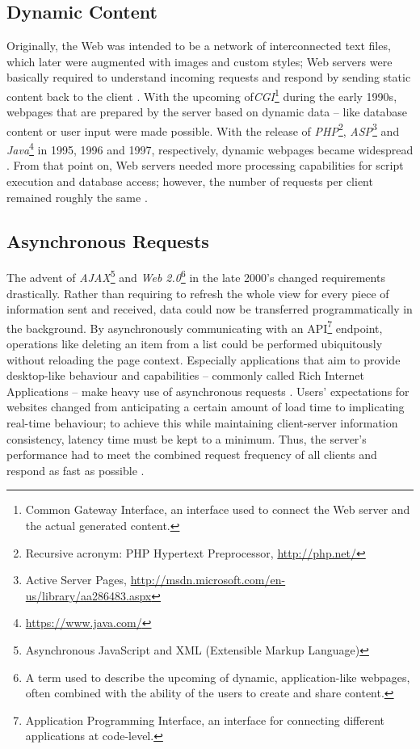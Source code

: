 \subsection{Dynamic Content}
Originally, the Web was intended to be a network of interconnected text files, which later were augmented with images and custom styles; Web servers were basically required to understand incoming requests and respond by sending static content back to the client \cite{http}. With the upcoming of\textit{CGI}\footnote{Common Gateway Interface, an interface used to connect the Web server and the actual generated content.} during the early 1990s, webpages that are prepared by the server based on dynamic data -- like database content or user input were made possible. With the release of \textit{PHP}\footnote{Recursive acronym: PHP Hypertext Preprocessor, \url{http://php.net/}}, \textit{ASP}\footnote{Active Server Pages, \url{http://msdn.microsoft.com/en-us/library/aa286483.aspx}} and \textit{Java}\footnote{\url{https://www.java.com/}} in 1995, 1996 and 1997, respectively, dynamic webpages became widespread \cite{webhistory}. From that point on, Web servers needed more processing capabilities for script execution and database access; however, the number of requests per client remained roughly the same \cite{webhistory}.

\subsection{Asynchronous Requests}
The advent of \textit{AJAX}\footnote{Asynchronous JavaScript and XML (Extensible Markup Language)} and \textit{Web 2.0}\footnote{A term used to describe the upcoming of dynamic, application-like webpages, often combined with the ability of the users to create and share content.} in the late 2000's changed requirements drastically. Rather than requiring to refresh the whole view for every piece of information sent and received, data could now be transferred programmatically in the background. By asynchronously communicating with an API\footnote{Application Programming Interface, an interface for connecting different applications at code-level.} endpoint, operations like deleting an item from a list could be performed ubiquitously without reloading the page context. Especially applications that aim to provide desktop-like behaviour and capabilities -- commonly called Rich Internet Applications -- make heavy use of asynchronous requests \cite[p. 4]{Sencha2011}. Users' expectations for websites changed from anticipating a certain amount of load time to implicating real-time behaviour; to achieve this while maintaining client-server information consistency, latency time must be kept to a minimum. Thus, the server's performance had to meet the combined request frequency of all clients and respond as fast as possible \cite{Garrett2005}.

